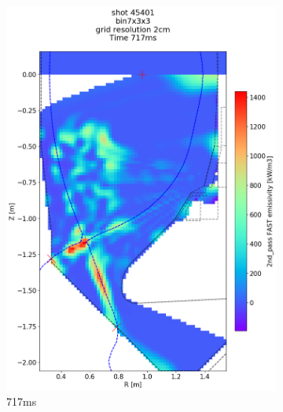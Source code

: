 \begin{figure}
\begin{subfigure}{0.395\linewidth}
         \includegraphics[trim={75 95 0 195},clip,width=\textwidth]{Chapters/chapter2/figs/IRVB-MASTU_shot-45401_export_89.png}
         \vspace*{-6.5mm}
         \caption{717ms}
         \label{fig:45401_export2_3}
     \end{subfigure}
     \begin{subfigure}{0.395\linewidth}
         \centering

\end{subfigure}
\end{figure}
